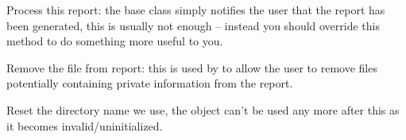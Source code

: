 \label{wxdebugreportprocess}


Process this report: the base class simply notifies the user that the
report has been generated, this is usually not enough -- instead you
should override this method to do something more useful to you.


\label{wxdebugreportremovefile}


Remove the file from report: this is used by 
 to allow the user to
remove files potentially containing private information from the report.


\label{wxdebugreportreset}


Reset the directory name we use, the object can't be used any more after
this as it becomes invalid/uninitialized.


